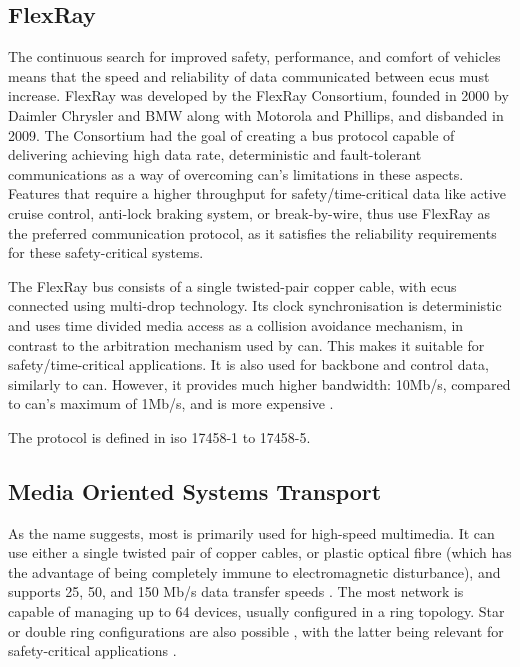 \subsection{FlexRay}

The continuous search for improved safety, performance, and comfort of vehicles means that the speed and reliability of data communicated between \glspl{ecu} must increase. FlexRay was developed by the FlexRay Consortium, founded in 2000 by Daimler Chrysler and BMW along with Motorola and Phillips, and disbanded in 2009. The Consortium had the goal of creating a bus protocol capable of delivering achieving high data rate, deterministic and fault-tolerant communications \citep{FlexRayFreescale} as a way of overcoming \gls{can}'s limitations in these aspects. Features that require a higher throughput for safety/time-critical data like active cruise control, anti-lock braking system, or break-by-wire, thus use FlexRay as the preferred communication protocol, as it satisfies the reliability requirements for these safety-critical systems.\par

The FlexRay bus consists of a single twisted-pair copper cable, with \glspl{ecu} connected using multi-drop technology. Its clock synchronisation is deterministic and uses time divided media access as a collision avoidance mechanism, in contrast to the arbitration mechanism used by \gls{can}. This makes it suitable for safety/time-critical applications. It is also used for backbone and control data, similarly to \gls{can}. However, it provides much higher bandwidth: 10Mb/s, compared to \gls{can}'s maximum of 1Mb/s, and is more expensive \citep{Huang2019}.\par

The protocol is defined in \gls{iso} 17458-1 to 17458-5.

\subsection{Media Oriented Systems Transport}

As the name suggests, \gls{most} is primarily used for high-speed multimedia. It can use either a single twisted pair of copper cables, or plastic optical fibre (which has the advantage of being completely immune to electromagnetic disturbance), and supports 25, 50, and 150 Mb/s data transfer speeds \citep{MOSTMicrochip}. The \gls{most} network is capable of managing up to 64 devices, usually configured in a ring topology. Star or double ring configurations are also possible \citep{MOSTVector}, with the latter being relevant for safety-critical applications \citep{Huang2019}.\par

